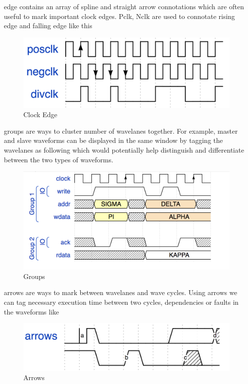 \documentclass[14pt]{extarticle}
\begin{document}
edge  contains an array of spline and straight arrow connotations which are often useful to mark important clock edges. Pclk, Nclk are used to connotate rising edge and falling edge like this

\begin{figure}[H]
    \centering
    \includegraphics[scale=0.7]{clock}
    \caption{Clock Edge}
    \label{fig:clock_edge}
\end{figure}

groups are ways to cluster number of wavelanes together. For example, master and slave waveforms can be displayed in the same window by tagging the wavelanes as following which would potentially help distinguish and differentiate between the two types of waveforms.

\begin{figure}[H]
    \centering
    \includegraphics[scale=0.7]{groups}
    \caption{Groups}
    \label{fig:groups}
\end{figure}

arrows are ways to mark between wavelanes and wave cycles. Using arrows we can tag necessary execution time between two cycles, dependencies or faults in the waveforms like 

\begin{figure}[H]
    \centering
    \includegraphics[scale=0.7]{arrow}
    \caption{Arrows}
    \label{fig:arrow}
\end{figure}
\end{document}
